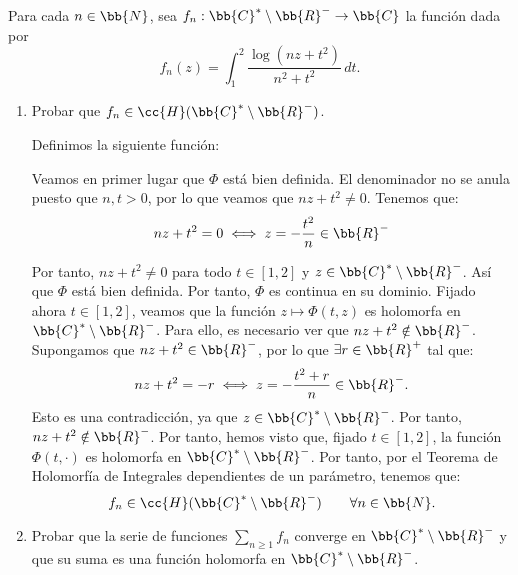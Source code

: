 \documentclass[12pt]{article}
\begin{document}
    
    \begin{ejercicio}[2.5 puntos]
        Para cada $n\in \bb{N}$, sea $f_n : \bb{C}^* \setminus \bb{R}^- \to \bb{C}$ la función dada por
        \[
            f_n(z) = \int_1^2 \frac{\log(nz + t^2)}{n^2 + t^2} \, dt.
        \]
        \begin{enumerate}
            \item Probar que $f_n \in \cc{H}(\bb{C}^* \setminus \bb{R}^-)$.
            
            Definimos la siguiente función:

            Veamos en primer lugar que $\Phi$ está bien definida. El denominador no se anula puesto que $n,t>0$, por lo que veamos que $nz+t^2\neq 0$. Tenemos que:
            \begin{equation*}
                nz+t^2 =0 \iff z = -\frac{t^2}{n}\in \bb{R}^-
            \end{equation*}

            Por tanto, $nz+t^2\neq 0$ para todo $t\in [1,2]$ y $z\in \bb{C}^* \setminus \bb{R}^-$. Así que $\Phi$ está bien definida. Por tanto, $\Phi$ es continua en su dominio. Fijado ahora $t \in [1,2]$, veamos que la función $z\mapsto \Phi(t,z)$ es holomorfa en $\bb{C}^* \setminus \bb{R}^-$. Para ello, es necesario ver que $nz+t^2\notin \bb{R}^-$. Supongamos que $nz+t^2\in \bb{R}^-$, por lo que $\exists r\in \bb{R}^+$ tal que:
            \begin{equation*}
                nz+t^2 = -r \iff z = -\frac{t^2+r}{n} \in \bb{R}^-.
            \end{equation*}
            Esto es una contradicción, ya que $z\in \bb{C}^* \setminus \bb{R}^-$. Por tanto, $nz+t^2\notin \bb{R}^-$. Por tanto, hemos visto que, fijado $t\in [1,2]$, la función $\Phi(t,\cdot)$ es holomorfa en $\bb{C}^* \setminus \bb{R}^-$. Por tanto, por el Teorema de Holomorfía de Integrales dependientes de un parámetro, tenemos que:
            \begin{equation*}
                f_n\in \cc{H}(\bb{C}^* \setminus \bb{R}^-)\qquad \forall n\in \bb{N}.
            \end{equation*}
            
            \item Probar que la serie de funciones $\sum\limits_{n\geq 1} f_n$ converge en $\bb{C}^* \setminus \bb{R}^-$ y que su suma es una función holomorfa en $\bb{C}^* \setminus \bb{R}^-$.
            

\end{enumerate}
\end{ejercicio}
\end{document}
